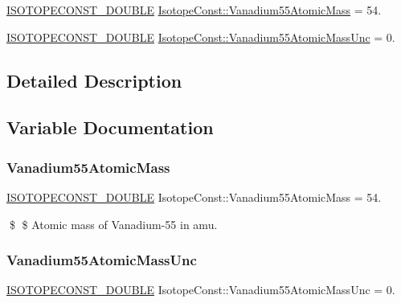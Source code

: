 \begin{DoxyCompactItemize}
\item 
\mbox{\hyperlink{group___isotope_const-_macros_ga8f45a7272ce02c0b4c65c44636ed719a}{I\+S\+O\+T\+O\+P\+E\+C\+O\+N\+S\+T\+\_\+\+D\+O\+U\+B\+LE}} \mbox{\hyperlink{group___isotope_const-_vanadium-_v55_ga8512ad65d8f4f084d3e27dd80217fcd6}{Isotope\+Const\+::\+Vanadium55\+Atomic\+Mass}} = 54.
\item 
\mbox{\hyperlink{group___isotope_const-_macros_ga8f45a7272ce02c0b4c65c44636ed719a}{I\+S\+O\+T\+O\+P\+E\+C\+O\+N\+S\+T\+\_\+\+D\+O\+U\+B\+LE}} \mbox{\hyperlink{group___isotope_const-_vanadium-_v55_gaeb408bead84a5a8c74b86c44008f30be}{Isotope\+Const\+::\+Vanadium55\+Atomic\+Mass\+Unc}} = 0.
\end{DoxyCompactItemize}


\subsection{Detailed Description}


\subsection{Variable Documentation}
\mbox{\label{group___isotope_const-_vanadium-_v55_ga8512ad65d8f4f084d3e27dd80217fcd6}} 
\subsubsection{\texorpdfstring{Vanadium55\+Atomic\+Mass}{Vanadium55AtomicMass}}
{\footnotesize\ttfamily \mbox{\hyperlink{group___isotope_const-_macros_ga8f45a7272ce02c0b4c65c44636ed719a}{I\+S\+O\+T\+O\+P\+E\+C\+O\+N\+S\+T\+\_\+\+D\+O\+U\+B\+LE}} Isotope\+Const\+::\+Vanadium55\+Atomic\+Mass = 54.}

\$ \$ Atomic mass of Vanadium-\/55 in amu. \mbox{\label{group___isotope_const-_vanadium-_v55_gaeb408bead84a5a8c74b86c44008f30be}} 
\subsubsection{\texorpdfstring{Vanadium55\+Atomic\+Mass\+Unc}{Vanadium55AtomicMassUnc}}
{\footnotesize\ttfamily \mbox{\hyperlink{group___isotope_const-_macros_ga8f45a7272ce02c0b4c65c44636ed719a}{I\+S\+O\+T\+O\+P\+E\+C\+O\+N\+S\+T\+\_\+\+D\+O\+U\+B\+LE}} Isotope\+Const\+::\+Vanadium55\+Atomic\+Mass\+Unc = 0.}

